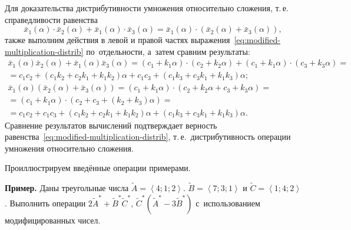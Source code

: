 Для доказательства дистрибутивности умножения относительно сложения, т.\,е. справедливости равенства 
\begin{equation}
\label{eq:modified-multiplication-distrib}
  \bar{x}_1\left(\alpha \right)\cdot \bar{x}_2\left(\alpha \right)+\bar{x}_1\left(\alpha \right)\cdot \bar{x}_3\left(\alpha \right)=\bar{x}_1\left(\alpha \right)\cdot \left(\bar{x}_2(\alpha )+\bar{x}_3(\alpha ) \right),
\end{equation}
также выполним действия в левой и правой частях выражения~\eqref{eq:modified-multiplication-distrib} по~отдельности, а~затем сравним результаты: \allowbreak
\begin{gather*}
  \bar{x}_1\left( \alpha \right)\bar{x}_2\left( \alpha  \right)+\bar{x}_1\left( \alpha  \right)\bar{x}_3\left( \alpha  \right)=(c_1+k_1\alpha )\cdot (c_2+k_2\alpha )+(c_1+k_1\alpha )\cdot (c_3+k_3\alpha )={}\\ 
  {}=c_1c_2+(c_1k_2+c_2k_1+k_1k_2)\alpha +c_1c_3+(c_1k_3+c_3k_1+k_1k_3)\alpha; \\ 
  \bar{x}_1\left( \alpha  \right)\left( \bar{x}_2\left( \alpha  \right)+\bar{x}_3\left( \alpha  \right) \right)=(c_1+k_1\alpha )\cdot (c_2+k_2\alpha +c_3+k_3\alpha )= \\ 
  =\left(c_1+k_1\alpha \right)\cdot \left(c_2+c_3+\left(k_2+k_3\right)\alpha \right)={}\\ 
  {}=c_1c_2+c_1c_3+\left(c_1k_2+c_2k_1+k_1k_2\right)\alpha +\left(c_1k_3+c_3k_1+k_1k_3\right)\alpha.  
\end{gather*}
Сравнение результатов вычислений подтверждает верность равенства~\eqref{eq:modified-multiplication-distrib}, т.\,е.~дистрибутивность операции умножения относительно сложения.

Проиллюстрируем введённые операции примерами.

\textbf{Пример.} Даны треугольные числа $\tilde{A}=\left\langle 4;1;2 \right\rangle $. $\tilde{B}=\left\langle 7;3;1 \right\rangle $ и $\tilde{C}=\left\langle 1;4;2 \right\rangle $. Выполнить операции $2\tilde{A}^*+\tilde{B}^*\tilde{C}^*$, $\tilde{C}^*\left( \tilde{A}^*-3\tilde{B}^* \right)$ с~использованием модифицированных чисел.

